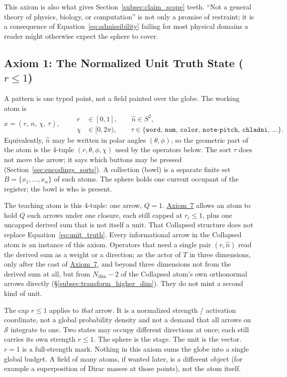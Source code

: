 \documentclass[12pt, a4paper]{article}
\begin{document}
This axiom is also what gives
Section~\ref{subsec:claim_scope} teeth. ``Not a general theory of
physics, biology, or computation'' is not only a promise of
restraint; it is a consequence of Equation~\eqref{eq:admissibility}
failing for most physical domains a reader might otherwise expect
the sphere to cover.

\subsection{Axiom 1: The Normalized Unit Truth State ($r \le 1$)}
\label{subsec:axiom1}
A pattern is one typed point, not a field painted over the globe. The working atom is
\begin{equation}
    x = (r,\,\hat n,\,\chi,\,\tau),
    \qquad
    \begin{aligned}
    r &\in [0,1],
    \qquad
    \hat n \in S^2,\\
    \chi &\in [0,2\pi),
    \qquad
    \tau \in \{\mathtt{word},\,\mathtt{num},\,\mathtt{color},\,\mathtt{note\text{-}pitch},\,\mathtt{chladni},\,\ldots\}.
    \end{aligned}
    \label{eq:unit_truth}
\end{equation}
Equivalently, $\hat n$ may be written in polar angles $(\theta,\phi)$, so the geometric part of the atom is the 4-tuple $(r,\theta,\phi,\chi)$ used by the operators below. The sort $\tau$ does not move the arrow; it says which buttons may be pressed (Section~\ref{sec:encodings_sorts}). A collection (bowl) is a separate finite set $B=\{x_1,\ldots,x_n\}$ of such atoms. The sphere holds one current occupant of the register; the bowl is who is present.

The teaching atom is this 4-tuple: one arrow, $Q=1$. \hyperref[subsec:axiom_v1_metrics]{Axiom~7} allows an atom to hold $Q$ such arrows under one closure, each still capped at $r_i\le 1$, plus one uncapped derived sum that is not itself a unit. That Collapsed structure does not replace Equation~\eqref{eq:unit_truth}. Every informational arrow in the Collapsed atom is an instance of this axiom. Operators that need a single pair $(r,\hat n)$ read the derived sum as a weight or a direction; as the actor of $T$ in three dimensions, only after the cast of \hyperref[subsec:axiom_v1_metrics]{Axiom~7}, and beyond three dimensions not from the derived sum at all, but from $N_{\mathrm{dim}}-2$ of the Collapsed atom's own orthonormal arrows directly (\S\ref{subsec:transform_higher_dim}). They do not mint a second kind of unit.

The cap $r \le 1$ applies to \emph{that} arrow. It is a normalized strength / activation coordinate, not a global probability density and not a demand that all arrows on $\mathcal{S}$ integrate to one. Two states may occupy
different directions at once; each still carries its own strength
$r\le 1$. The sphere is the stage. The unit is the vector.
$r=1$ is a full-strength mark. Nothing in this axiom sums the globe
into a single global budget. A field of many atoms, if wanted later, is a different object (for example a superposition of Dirac masses at those points), not the atom itself.
\end{document}
